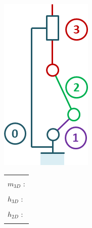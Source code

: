 \documentclass[10pt,fleqn]{article} %
\begin{document}
\begin{multicols}{2}
\begin{minipage}[c]{.45\linewidth}
\begin{center}
\includegraphics[width=.8\linewidth]{images/cas_09.png}
\end{center}
\end{minipage} \hfill
\begin{minipage}[c]{.5\linewidth}
\begin{center}
\begin{tabular}{|p{3cm}|}
\hline 
\\
$m_{3D}$ : \\
\\
$h_{3D}$ : \\
\\
$h_{2D}$ : \\
\\
\hline
\end{tabular}
\end{center}
\end{minipage}



\end{multicols}
\end{document}
